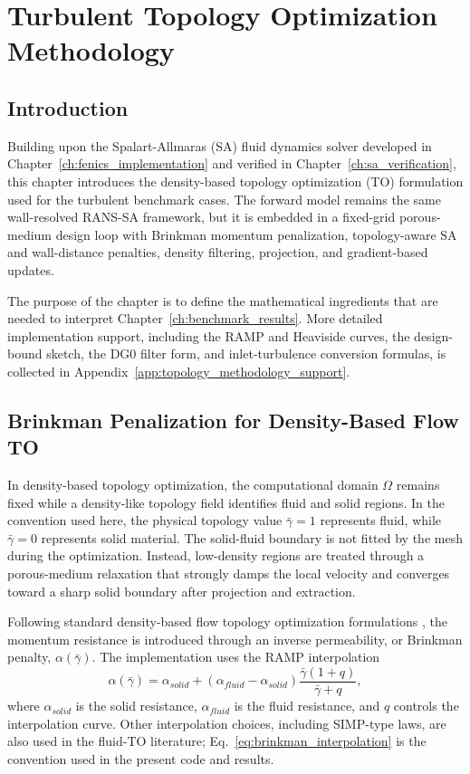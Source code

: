 \chapter{Turbulent Topology Optimization Methodology}
\label{ch:topology_optimization_methodology}

\section{Introduction}
Building upon the Spalart-Allmaras (SA) fluid dynamics solver \cite{Spalart1992, Spalart1994} developed in Chapter~\ref{ch:fenics_implementation} and verified in Chapter~\ref{ch:sa_verification}, this chapter introduces the density-based topology optimization (TO) formulation used for the turbulent benchmark cases. The forward model remains the same wall-resolved RANS-SA framework, but it is embedded in a fixed-grid porous-medium design loop with Brinkman momentum penalization, topology-aware SA and wall-distance penalties, density filtering, projection, and gradient-based updates.

The purpose of the chapter is to define the mathematical ingredients that are needed to interpret Chapter~\ref{ch:benchmark_results}. More detailed implementation support, including the RAMP and Heaviside curves, the design-bound sketch, the DG0 filter form, and inlet-turbulence conversion formulas, is collected in Appendix~\ref{app:topology_methodology_support}.

\section{Brinkman Penalization for Density-Based Flow TO}
\label{sec:brinkman_density_to}
In density-based topology optimization, the computational domain $\Omega$ remains fixed while a density-like topology field identifies fluid and solid regions. In the convention used here, the physical topology value $\bar{\gamma}=1$ represents fluid, while $\bar{\gamma}=0$ represents solid material. The solid-fluid boundary is not fitted by the mesh during the optimization. Instead, low-density regions are treated through a porous-medium relaxation that strongly damps the local velocity and converges toward a sharp solid boundary after projection and extraction.

Following standard density-based flow topology optimization formulations \cite{Borrvall2003,Gersborg2005}, the momentum resistance is introduced through an inverse permeability, or Brinkman penalty, $\alpha(\bar{\gamma})$. The implementation uses the RAMP interpolation \cite{Stolpe2001}
\begin{equation}
	\alpha(\bar{\gamma}) = \alpha_{solid} + (\alpha_{fluid} - \alpha_{solid}) \frac{\bar{\gamma} (1 + q)}{\bar{\gamma} + q},
	\label{eq:brinkman_interpolation}
\end{equation}
where $\alpha_{solid}$ is the solid resistance, $\alpha_{fluid}$ is the fluid resistance, and $q$ controls the interpolation curve. Other interpolation choices, including SIMP-type laws, are also used in the fluid-TO literature; Eq.~\ref{eq:brinkman_interpolation} is the convention used in the present code and results.

